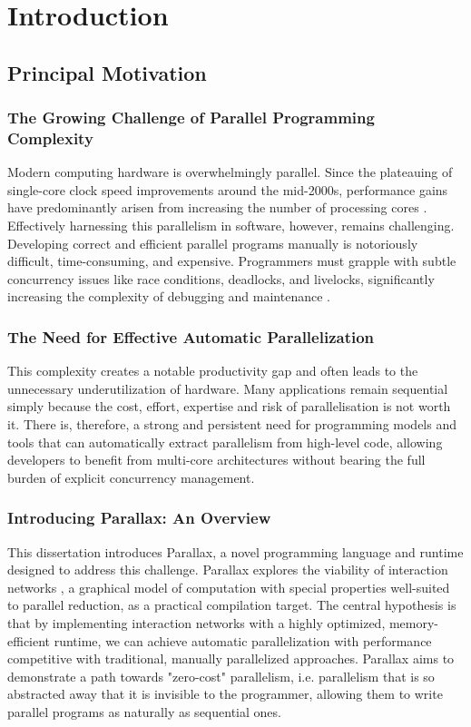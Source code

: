 \chapter{Introduction}

\section{Principal Motivation}

\subsection{The Growing Challenge of Parallel Programming Complexity}
Modern computing hardware is overwhelmingly parallel. Since the plateauing of single-core clock speed improvements around the mid-2000s, performance gains have predominantly arisen from increasing the number of processing cores \cite{Asanovic2006TheLandscape}. Effectively harnessing this parallelism in software, however, remains challenging. Developing correct and efficient parallel programs manually is notoriously difficult, time-consuming, and expensive. Programmers must grapple with subtle concurrency issues like race conditions, deadlocks, and livelocks, significantly increasing the complexity of debugging and maintenance \cite{Lee2006TheProblem}.

\subsection{The Need for Effective Automatic Parallelization}
This complexity creates a notable productivity gap and often leads to the unnecessary underutilization of hardware. Many applications remain sequential simply because the cost, effort, expertise and risk of parallelisation is not worth it. There is, therefore, a strong and persistent need for programming models and tools that can automatically extract parallelism from high-level code, allowing developers to benefit from multi-core architectures without bearing the full burden of explicit concurrency management.

\subsection{Introducing Parallax: An Overview}
This dissertation introduces Parallax, a novel programming language and runtime designed to address this challenge. Parallax explores the viability of interaction networks \cite{lafont1990interactionnets}, a graphical model of computation with special properties well-suited to parallel reduction, as a practical compilation target. The central hypothesis is that by implementing interaction networks with a highly optimized, memory-efficient runtime, we can achieve automatic parallelization with performance competitive with traditional, manually parallelized approaches. Parallax aims to demonstrate a path towards "zero-cost" parallelism, i.e. parallelism that is so abstracted away that it is invisible to the programmer, allowing them to write parallel programs as naturally as sequential ones.

